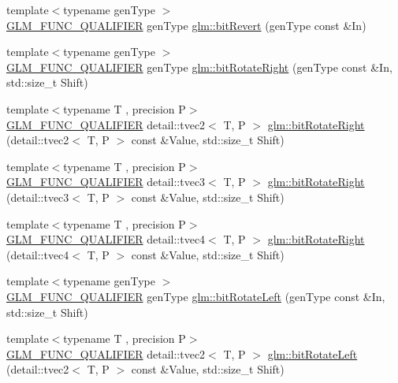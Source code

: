 \begin{DoxyCompactItemize}
\item 
{\footnotesize template$<$typename gen\+Type $>$ }\\\hyperlink{setup_8hpp_a33fdea6f91c5f834105f7415e2a64407}{G\+L\+M\+\_\+\+F\+U\+N\+C\+\_\+\+Q\+U\+A\+L\+I\+F\+I\+ER} gen\+Type \hyperlink{group__gtx__bit_ga2d3939fbf96aa54cb2fd3461a60aba02}{glm\+::bit\+Revert} (gen\+Type const \&In)
\item 
{\footnotesize template$<$typename gen\+Type $>$ }\\\hyperlink{setup_8hpp_a33fdea6f91c5f834105f7415e2a64407}{G\+L\+M\+\_\+\+F\+U\+N\+C\+\_\+\+Q\+U\+A\+L\+I\+F\+I\+ER} gen\+Type \hyperlink{group__gtx__bit_gaf999dbfe97a5be5ea68841a58cf89a4a}{glm\+::bit\+Rotate\+Right} (gen\+Type const \&In, std\+::size\+\_\+t Shift)
\item 
{\footnotesize template$<$typename T , precision P$>$ }\\\hyperlink{setup_8hpp_a33fdea6f91c5f834105f7415e2a64407}{G\+L\+M\+\_\+\+F\+U\+N\+C\+\_\+\+Q\+U\+A\+L\+I\+F\+I\+ER} detail\+::tvec2$<$ T, P $>$ \hyperlink{namespaceglm_ad95103bee42199639a722beef3c98538}{glm\+::bit\+Rotate\+Right} (detail\+::tvec2$<$ T, P $>$ const \&Value, std\+::size\+\_\+t Shift)
\item 
{\footnotesize template$<$typename T , precision P$>$ }\\\hyperlink{setup_8hpp_a33fdea6f91c5f834105f7415e2a64407}{G\+L\+M\+\_\+\+F\+U\+N\+C\+\_\+\+Q\+U\+A\+L\+I\+F\+I\+ER} detail\+::tvec3$<$ T, P $>$ \hyperlink{namespaceglm_acd2e2cfc11667479cf8c279667cfb162}{glm\+::bit\+Rotate\+Right} (detail\+::tvec3$<$ T, P $>$ const \&Value, std\+::size\+\_\+t Shift)
\item 
{\footnotesize template$<$typename T , precision P$>$ }\\\hyperlink{setup_8hpp_a33fdea6f91c5f834105f7415e2a64407}{G\+L\+M\+\_\+\+F\+U\+N\+C\+\_\+\+Q\+U\+A\+L\+I\+F\+I\+ER} detail\+::tvec4$<$ T, P $>$ \hyperlink{namespaceglm_a06a3b8df080a9a4b7dd1148134ade32a}{glm\+::bit\+Rotate\+Right} (detail\+::tvec4$<$ T, P $>$ const \&Value, std\+::size\+\_\+t Shift)
\item 
{\footnotesize template$<$typename gen\+Type $>$ }\\\hyperlink{setup_8hpp_a33fdea6f91c5f834105f7415e2a64407}{G\+L\+M\+\_\+\+F\+U\+N\+C\+\_\+\+Q\+U\+A\+L\+I\+F\+I\+ER} gen\+Type \hyperlink{group__gtx__bit_ga32c0a5149152a9aa75afafe81b19be53}{glm\+::bit\+Rotate\+Left} (gen\+Type const \&In, std\+::size\+\_\+t Shift)
\item 
{\footnotesize template$<$typename T , precision P$>$ }\\\hyperlink{setup_8hpp_a33fdea6f91c5f834105f7415e2a64407}{G\+L\+M\+\_\+\+F\+U\+N\+C\+\_\+\+Q\+U\+A\+L\+I\+F\+I\+ER} detail\+::tvec2$<$ T, P $>$ \hyperlink{namespaceglm_a1f2d95e740a8909b8b5d760722f04954}{glm\+::bit\+Rotate\+Left} (detail\+::tvec2$<$ T, P $>$ const \&Value, std\+::size\+\_\+t Shift)

\end{DoxyCompactItemize}
